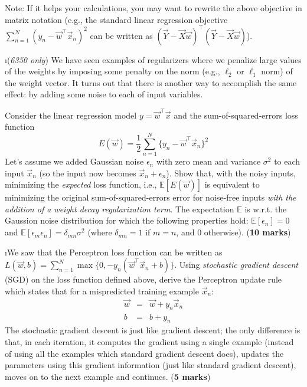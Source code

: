 \documentclass[fleqn]{article}
\begin{document}
Note: If it helps your calculations, you may want to rewrite the above 
objective in matrix notation (e.g., the standard 
linear regression objective $\sum_{n=1}^N (y_n - 
\vec{w}^\top\vec{x}_n)^2$ can be written as $(\vec{Y}-\vec{X}\vec{w})^\top 
(\vec{Y}-\vec{X}\vec{w})$).

\i (\textit{6350 only}) We have seen examples of regularizers
where we penalize large values of the weights by imposing 
some penalty on the norm (e.g., $\ell_2$ or $\ell_1$ norm) 
of the weight vector. It turns out that there is another way to 
accomplish the same effect: by adding some noise to each of input
variables.

Consider the linear regression model 
$y = \vec{w}^\top \vec{x}$ and the sum-of-squared-errors loss 
function 
\[
 E(\vec{w}) = \frac{1}{2}\sum_{n=1}^N \{y_n - \vec{w}^\top \vec{x}_n\}^2
\]
Let's assume we added Gaussian noise $\epsilon_n$ with zero mean
and variance $\sigma^2$ to each input $\vec{x}_n$ (so the input now
becomes $\vec{x}_n + \epsilon_n$). Show that, with the noisy inputs, 
minimizing the \textit{expected} loss function, i.e., $\mathbb{E}[E(\vec{w})]$ 
is equivalent to minimizing the original sum-of-squared-errors error for 
noise-free inputs \textit{with the addition of a weight decay regularization term}. 
The expectation $\mathbb{E}$ is w.r.t. the Gaussion noise distribution 
for which the following properties hold: $\mathbb{E}[\epsilon_n] = 0$ 
and $\mathbb{E}[\epsilon_m\epsilon_n] = \delta_{mn}\sigma^2$ (where 
$\delta_{mn}=1$ if $m=n$, and 0 otherwise). (\textbf{10 marks})

\i We saw that the Perceptron loss function can be written
as $L(\vec{w},b) = \sum_{n=1}^N \max\{0,-y_n(\vec{w}^\top\vec{x}_n+b)\}$. 
Using \textit{stochastic gradient descent} (SGD) on the loss function 
defined above, derive the Perceptron update rule which states that 
for a mispredicted training example $\vec{x}_n$:
\begin{eqnarray}
 \vec{w} &=& \vec{w} + y_n \vec{x}_n \nonumber \\
  b &=& b + y_n \nonumber
\end{eqnarray}
The stochastic gradient descent is just like gradient descent; the only 
difference is that, in each iteration, it computes the gradient using a 
single example (instead of using all the examples which standard gradient
descent does), updates the parameters using this gradient information 
(just like standard gradient descent), moves on to the next example and 
continues. (\textbf{5 marks})
\end{document}
